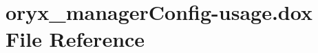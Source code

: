 \section{oryx\-\_\-manager\-Config-\/usage.dox \-File \-Reference}
\label{oryx__managerConfig-usage_8dox}
